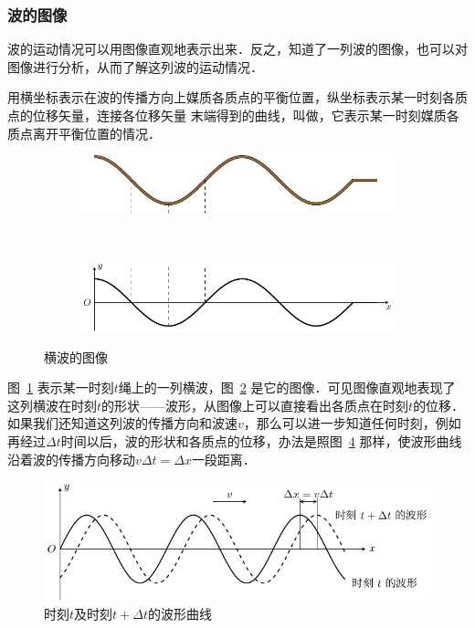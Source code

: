 \subsubsection{波的图像}

波的运动情况可以用图像直观地表示出来．反之，知道了一列波的图像，也可以对图像进行分析，从而了解这列波的运动情况．

用横坐标表示在波的传播方向上媒质各质点的平衡位置，纵坐标表示某一时刻各质点的位移矢量，连接各位移矢量
末端得到的曲线，叫做，它表示某一时刻媒质各质点离开平衡位置的情况．
\begin{figure}[htbp]
    \centering
    \begin{subfigure}{0.8\linewidth}
        \centering
        \includegraphics{fig/A/9-17a.pdf}
        \caption{}\label{fig_A_9-17a}
    \end{subfigure}
    \\
    \begin{subfigure}{0.8\linewidth}
        \centering
        \includegraphics{fig/A/9-17b.pdf}
        \caption{}\label{fig_A_9-17b}
    \end{subfigure}
    \caption{横波的图像}\label{fig_A_9-17}
\end{figure}


图~\ref{fig_A_9-17a} 表示某一时刻$t$绳上的一列横波，图~\ref{fig_A_9-17b} 是它的图像．可见图像直观地表现了这列横波在时刻$t$的形状——波形，从图像上可以直接看出各质点在时刻$t$的位移．
如果我们还知道这列波的传播方向和波速$v$，那么可以进一步知道任何时刻，例如再经过$\Delta t$时间以后，波的形状和各质点的位移，办法是照图~\ref{fig_A_9-18} 那样，使波形曲线沿着波的传播方向移动$v\Delta t=\Delta x$一段距离．
\begin{figure}[htbp]
	\centering
	\includegraphics{fig/A/9-18.pdf}
	\caption{时刻$t$及时刻$t+\Delta t$的波形曲线}\label{fig_A_9-18}
\end{figure}



